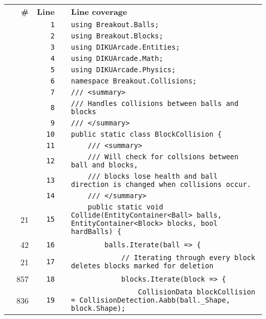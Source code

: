 \documentclass[a4paper,landscape,10pt]{article}
\begin{document}
\begin{longtable}[l]{lrrll}
\textbf{} & \textbf{\#} & \textbf{Line} & \textbf{} & \textbf{Line coverage}\\
\cellcolor{gray} &  & \verb~1~ & & \verb~using Breakout.Balls;~\\
\cellcolor{gray} &  & \verb~2~ & & \verb~using Breakout.Blocks;~\\
\cellcolor{gray} &  & \verb~3~ & & \verb~using DIKUArcade.Entities;~\\
\cellcolor{gray} &  & \verb~4~ & & \verb~using DIKUArcade.Math;~\\
\cellcolor{gray} &  & \verb~5~ & & \verb~using DIKUArcade.Physics;~\\
\cellcolor{gray} &  & \verb~6~ & & \verb~namespace Breakout.Collisions;~\\
\cellcolor{gray} &  & \verb~7~ & & \verb~/// <summary>~\\
\cellcolor{gray} &  & \verb~8~ & & \verb~/// Handles collisions between balls and blocks~\\
\cellcolor{gray} &  & \verb~9~ & & \verb~/// </summary>~\\
\cellcolor{gray} &  & \verb~10~ & & \verb~public static class BlockCollision {~\\
\cellcolor{gray} &  & \verb~11~ & & \verb~    /// <summary>~\\
\cellcolor{gray} &  & \verb~12~ & & \verb~    /// Will check for collsions between ball and blocks,~\\
\cellcolor{gray} &  & \verb~13~ & & \verb~    /// blocks lose health and ball direction is changed when collisions occur.~\\
\cellcolor{gray} &  & \verb~14~ & & \verb~    /// </summary>~\\
\cellcolor{green} & 21 & \verb~15~ & & \verb~    public static void Collide(EntityContainer<Ball> balls, EntityContainer<Block> blocks, bool hardBalls) {~\\
\cellcolor{green} & 42 & \verb~16~ & & \verb~        balls.Iterate(ball => {~\\
\cellcolor{green} & 21 & \verb~17~ & & \verb~            // Iterating through every block deletes blocks marked for deletion~\\
\cellcolor{green} & 857 & \verb~18~ & & \verb~            blocks.Iterate(block => {~\\
\cellcolor{green} & 836 & \verb~19~ & & \verb~                CollisionData blockCollision = CollisionDetection.Aabb(ball._Shape, block.Shape);~\\

\end{longtable}
\end{document}
